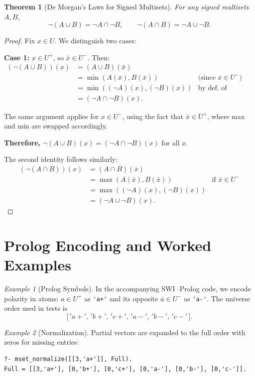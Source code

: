 \documentclass{article}
\theoremstyle{plain}
\newtheorem{theorem}{Theorem}
\theoremstyle{definition}
\theoremstyle{remark}
\newtheorem{example}{Example}
\begin{document}
\begin{theorem}[De Morgan's Laws for Signed Multisets]
    For any signed multisets \(A, B\),
    \[
    \neg (A \cup B) = \neg A \cap \neg B, \qquad \neg (A \cap B) = \neg A \cup \neg B.
    \]
\end{theorem}

\begin{proof}
	Fix \(x \in U\). We distinguish two cases:
	
	\textbf{Case 1:} \(x \in U^+\), so \(\bar{x} \in U^-\). Then:
	\begin{align*}
		(\neg(A \cup B))(x) &= (A \cup B)(\bar{x}) \\
		&= \min(A(\bar{x}), B(\bar{x})) &\text{(since } \bar{x} \in U^-\text{)} \\
		&= \min((\neg A)(x), (\neg B)(x)) &\text{by def. of complement} \\
		&= (\neg A \cap \neg B)(x).
	\end{align*}
	
	The same argument applies for \(x \in U^-\), using the fact that \(\bar{x} \in U^+\), where max and min are swapped accordingly.
	
	\textbf{Therefore,} \(\neg(A \cup B)(x) = (\neg A \cap \neg B)(x)\) for all \(x\).
	
	The second identity follows similarly:
	\begin{align*}
		(\neg(A \cap B))(x) &= (A \cap B)(\bar{x}) \\
		&= \max(A(\bar{x}), B(\bar{x})) &\text{if } \bar{x} \in U^- \\
		&= \max((\neg A)(x), (\neg B)(x)) \\
		&= (\neg A \cup \neg B)(x).
	\end{align*}
\end{proof}

\section*{Prolog Encoding and Worked Examples}

\begin{example}[Prolog Symbols]
In the accompanying SWI\,--Prolog code, we encode polarity in atoms: \(a \in U^{+}\) as \verb|'a+'| and its opposite \(\bar{a} \in U^{-}\) as \verb|'a-'|. The universe order used in tests is
\[
\big[\,'a+',\,'b+',\,'c+',\,'a-',\,'b-',\,'c-'\,\big].
\]
\end{example}

\begin{example}[Normalization]
Partial vectors are expanded to the full order with zeros for missing entries:
\begin{verbatim}
?- mset_normalize([[3,'a+']], Full).
Full = [[3,'a+'], [0,'b+'], [0,'c+'], [0,'a-'], [0,'b-'], [0,'c-']].
\end{verbatim}
\end{example}
\end{document}
